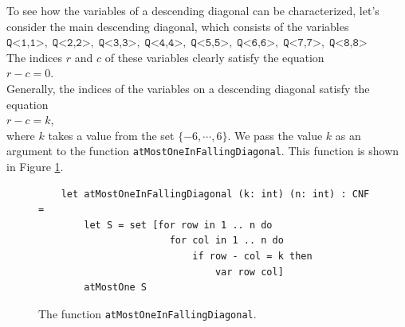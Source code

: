 To see how the variables of a descending diagonal can be characterized, let's consider the main descending diagonal, which consists of the
variables \\[0.2cm]
\hspace*{1.3cm} 
$\texttt{Q<1,1>},\; \texttt{Q<2,2>},\; \texttt{Q<3,3>},\; \texttt{Q<4,4>},\; \texttt{Q<5,5>},\; 
 \texttt{Q<6,6>},\; \texttt{Q<7,7>},\; \texttt{Q<8,8>}$ 
\\[0.2cm]
The indices $r$ and $c$ of these variables clearly satisfy
the equation \\[0.2cm]
\hspace*{1.3cm} $r - c = 0$. \\[0.2cm]
Generally, the indices of the variables on a descending diagonal satisfy the equation \\[0.2cm]
\hspace*{1.3cm} $r - c = k$, \\[0.2cm]
where $k$ takes a value from the set $\{-6, \cdots, 6 \}$. We pass the value $k$ as an argument to the
function \texttt{atMostOneInFallingDiagonal}. This function is shown in Figure
\ref{fig:atMostOneInLowerDiagonal}.

\begin{figure}[!ht]
  \centering
\begin{verbatim}
    let atMostOneInFallingDiagonal (k: int) (n: int) : CNF =
        let S = set [for row in 1 .. n do
                       for col in 1 .. n do
                           if row - col = k then
                               var row col]
        atMostOne S
\end{verbatim}
\vspace*{-0.3cm}
  \caption{The function \texttt{atMostOneInFallingDiagonal}.}
  \label{fig:atMostOneInLowerDiagonal}
\end{figure}

